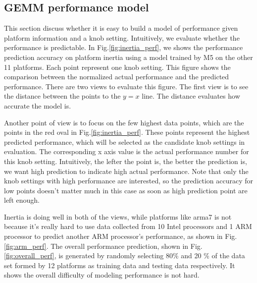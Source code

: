   \subsection{GEMM performance model}
  \label{sec:GEMMperf}
  This section discuss whether it is easy to build a model of \gem performance
  given platform information and a knob setting. Intuitively, we evaluate
  whether the \gem performance is predictable. In Fig.\ref{fig:inertia_perf},
  we shows the performance prediction accuracy on platform inertia using a model
  trained by M5 on the other 11 platforms. Each point represent one knob
  setting. This figure shows the comparison between the normalized actual
  performance and the predicted performance. There are two views to evaluate
  this figure. The first view is to see the distance between the points to the
  $y=x$ line. The distance evaluates how accurate the model is.

  Another point of
  view is to focus on the few highest data points, which are the points in the
  red oval in Fig.\ref{fig:inertia_perf}. These points represent the highest
  predicted performance, which will be selected as the candidate knob settings
  in \atl evaluation. The corresponding x axis value is the actual performance
  number for this knob setting. Intuitively, the lefter the point is, the
  better the prediction is, we want high prediction to indicate high actual
  performance. Note that only the knob settings with high performance are
  interested, so the prediction accuracy for low points doesn't matter much in
  this case as soon as high prediction point are left enough.

  Inertia is doing well in both of the views, while platforms like arma7 is not
  because it's really hard to use data collected from 10 Intel processors and 1
  ARM processor to predict another ARM processor's performance, as shown in
  Fig.\ref{fig:arm_perf}. The overall performance prediction, shown in
  Fig.\ref{fig:overall_perf}, is generated by randomly selecting 80\% and 20 \%
  of the data set formed by 12 platforms as training data and testing data
  respectively. It shows the overall difficulty of modeling \gem performance
  is not hard.

